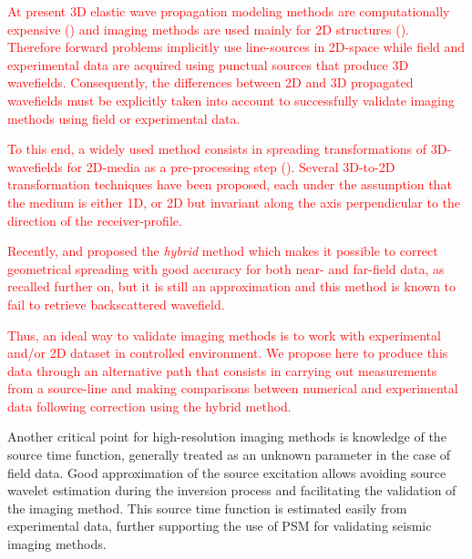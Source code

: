 \documentclass[extra,mreferee]{gji}
\begin{document}
\textcolor{red}{At present 3D elastic wave propagation modeling methods are computationally expensive (\cite{etienne2010computational,borisov2013efficient,brossier2013performances,butzer20133d,borisov2015three}) and imaging methods are used mainly for 2D structures (\cite{brossier2009two,romdhane2011shallow,bretaudeau20132d,groos2014role}). Therefore forward problems implicitly use line-sources in 2D-space while field and experimental data are acquired using punctual sources that produce 3D wavefields. Consequently, the differences between 2D and 3D propagated wavefields must be explicitly taken into account to successfully validate imaging methods using field or experimental data.}

\textcolor{red}{To this end, a widely used method consists in spreading transformations of 3D-wavefields for 2D-media as a pre-processing step (\cite{crase1990robust,shipp2002two,ravaut2004multiscale,wang2009reflection,Bretaudeau_FWI_2013}). Several 3D-to-2D transformation techniques have been proposed, each under the assumption that the medium is either 1D, or 2D but invariant along the axis perpendicular to the direction of the receiver-profile.}

\textcolor{red}{Recently, \cite{Forbriger_LSS_2014} and \cite{schafer_lss_2014} proposed the \textit{hybrid} method which makes it possible to correct geometrical spreading with good accuracy for both near- and far-field data, as recalled further on, but it is still an approximation and this method is known to fail to retrieve backscattered wavefield.}


\textcolor{red}{Thus, an ideal way to validate imaging methods is to work with experimental and/or 2D dataset in controlled environment. We propose here to produce this data through an alternative path that consists in carrying out measurements from a source-line and making comparisons between numerical and experimental data following correction using the hybrid method.}

Another critical point for high-resolution imaging methods is knowledge of the source time function, generally treated as an unknown parameter in the case of field data. Good approximation of the source excitation allows avoiding source wavelet estimation during the inversion process and facilitating the validation of the imaging method. This source time function is estimated easily from experimental data, further supporting the use of PSM for validating seismic imaging methods.
\end{document}
